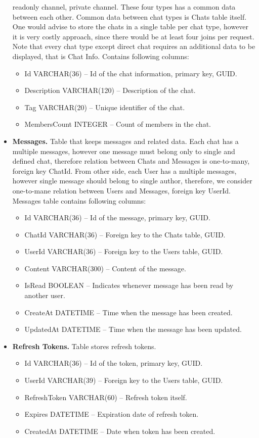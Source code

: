 \begin{itemize}
    readonly channel, private channel.
    These four types has a common data between each other.
    Common data between chat types is Chats table itself.
    One would advise to store the chats in a single table per chat type, however it is very costly approach, since there
    would be at least four joins per request.
    Note that every chat type except direct chat requires an additional data to be displayed, that is Chat Info.
    Contains following columns:
    \begin{itemize}
        \item Id VARCHAR(36) -- Id of the chat information, primary key, GUID\@.
        \item Description VARCHAR(120) -- Description of the chat.
        \item Tag VARCHAR(20) -- Unique identifier of the chat.
        \item MembersCount INTEGER -- Count of members in the chat.
    \end{itemize}
    \item \textbf{Messages.} Table that keeps messages and related data.
    Each chat has a multiple messages, however one message must belong only to single and defined chat,
    therefore relation between Chats and Messages is one-to-many, foreign key ChatId.
    From other side, each User has a multiple messages, however single message should belong to single author,
    therefore, we consider one-to-mane relation between Users and Messages, foreign key UserId.
    Messages table contains following columns:
    \begin{itemize}
        \item Id VARCHAR(36) -- Id of the message, primary key, GUID\@.
        \item ChatId VARCHAR(36) -- Foreign key to the Chats table, GUID\@.
        \item UserId VARCHAR(36) -- Foreign key to the Users table, GUID\@.
        \item Content VARCHAR(300) -- Content of the message.
        \item IsRead BOOLEAN -- Indicates whenever message has been read by another user.
        \item CreateAt DATETIME -- Time when the message has been created.
        \item UpdatedAt DATETIME -- Time when the message has been updated.
    \end{itemize}
    \item \textbf{Refresh Tokens.} Table stores refresh tokens.
    \begin{itemize}
        \item Id VARCHAR(36) -- Id of the token, primary key, GUID\@.
        \item UserId VARCHAR(39) -- Foreign key to the Users table, GUID\@.
        \item RefreshToken VARCHAR(60) -- Refresh token itself.
        \item Expires DATETIME -- Expiration date of refresh token.
        \item CreatedAt DATETIME -- Date when token has been created.
    \end{itemize}
\end{itemize}
